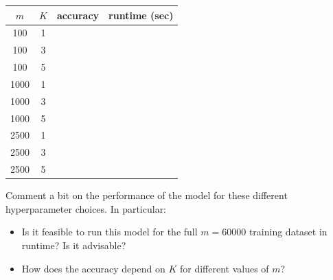 \documentclass{article}
\begin{document}
\begin{enumerate}
\begin{itemize}
\begin{center}
\begin{tabular}{cccc}
$m$ & $K$ & accuracy & runtime (sec)\\\hline
100 & 1 & & \\
100 & 3 & & \\
100 & 5 & & \\
1000 & 1 & & \\
1000 & 3 & & \\
1000 & 5 & & \\
2500 & 1 & & \\
2500 & 3 & & \\
2500 & 5 & & \\
\end{tabular}
\end{center}

 Comment a bit on the performance of the model for these different hyperparameter choices. In particular:

\begin{itemize}
\item Is it feasible to run this model for the full $m = 60000$ training dataset in runtime? Is it advisable?



\item How does the accuracy depend on $K$ for different values of $m$?






\end{itemize}


\end{itemize}



\end{enumerate}
\end{document}
